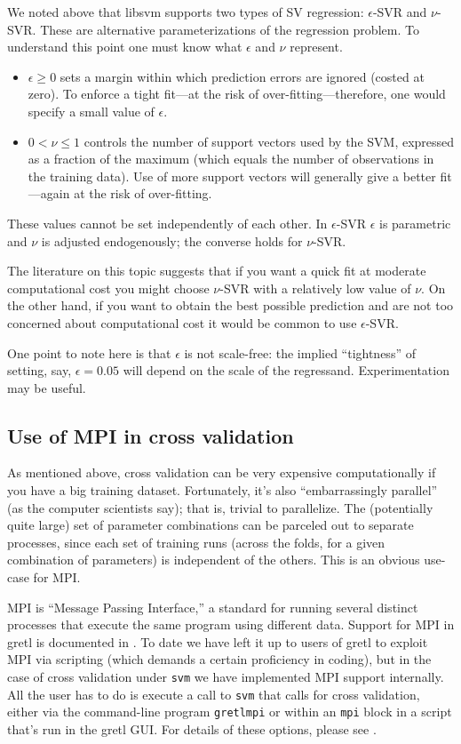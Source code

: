 \documentclass{article}
\begin{document}
We noted above that libsvm supports two types of SV regression:
$\epsilon$-SVR and $\nu$-SVR. These are alternative parameterizations
of the regression problem. To understand this point one must know what
$\epsilon$ and $\nu$ represent.
\begin{itemize}
\item $\epsilon \geq 0$ sets a margin within which prediction errors
  are ignored (costed at zero). To enforce a tight fit---at the risk
  of over-fitting---therefore, one would specify a small value of
  $\epsilon$.
\item $0 < \nu \leq 1$ controls the number of support vectors used by
  the SVM, expressed as a fraction of the maximum (which equals the
  number of observations in the training data). Use of more support
  vectors will generally give a better fit---again at the risk of
  over-fitting.
\end{itemize}
These values cannot be set independently of each other. In
$\epsilon$-SVR $\epsilon$ is parametric and $\nu$ is adjusted
endogenously; the converse holds for $\nu$-SVR.

The literature on this topic suggests that if you want a quick fit at
moderate computational cost you might choose $\nu$-SVR with a
relatively low value of $\nu$. On the other hand, if you want to
obtain the best possible prediction and are not too concerned about
computational cost it would be common to use $\epsilon$-SVR.

One point to note here is that $\epsilon$ is not scale-free: the
implied ``tightness'' of setting, say, $\epsilon = 0.05$ will depend
on the scale of the regressand. Experimentation may be useful.

\subsection{Use of MPI in cross validation}
\label{sec:mpi}

As mentioned above, cross validation can be very expensive
computationally if you have a big training dataset. Fortunately, it's
also ``embarrassingly parallel'' (as the computer scientists say);
that is, trivial to parallelize. The (potentially quite large) set of
parameter combinations can be parceled out to separate processes,
since each set of training runs (across the folds, for a given
combination of parameters) is independent of the others. This is an
obvious use-case for MPI.

MPI is ``Message Passing Interface,'' a standard for running several
distinct processes that execute the same program using different
data. Support for MPI in gretl is documented in \cite{gretl-mpi}.  To
date we have left it up to users of gretl to exploit MPI via scripting
(which demands a certain proficiency in coding), but in the case of
cross validation under \texttt{svm} we have implemented MPI support
internally. All the user has to do is execute a call to \texttt{svm}
that calls for cross validation, either via the command-line program
\texttt{gretlmpi} or within an \texttt{mpi} block in a script that's
run in the gretl GUI. For details of these options, please see
\cite{gretl-mpi}.
\end{document}

